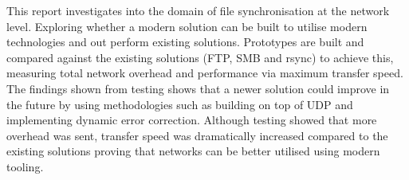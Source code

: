 This report investigates into the domain of file synchronisation at the network level. Exploring whether a modern solution can be built to utilise modern technologies and out perform existing solutions. Prototypes are built and compared against the existing solutions (FTP, SMB and rsync) to achieve this, measuring total network overhead and performance via maximum transfer speed. The findings shown from testing shows that a newer solution could improve in the future by using methodologies such as building on top of UDP and implementing dynamic error correction. Although testing showed that more overhead was sent, transfer speed was dramatically increased compared to the existing solutions proving that networks can be better utilised using modern tooling.
